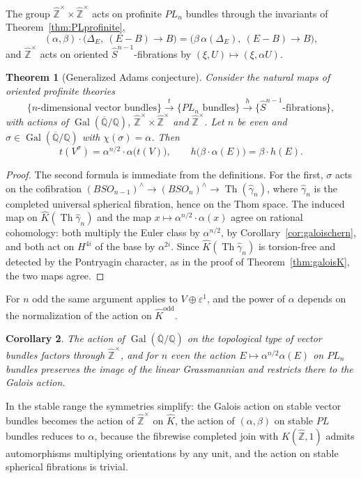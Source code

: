 \documentclass[11pt]{amsart}
\theoremstyle{plain}
\newtheorem{theorem}{Theorem}[section]
\newtheorem{corollary}[theorem]{Corollary}
\theoremstyle{definition}
\numberwithin{equation}{section}
\newcommand{\Q}{\mathbb{Q}}
\newcommand{\Zhat}{\widehat{\mathbb{Z}}}
\newcommand{\Qbar}{\overline{\mathbb{Q}}}
\newcommand{\units}{^{\times}}
\DeclareMathOperator{\Gal}{Gal}
\begin{document}
The group $\Zhat\units\times\Zhat\units$ acts on profinite $PL_n$ bundles through the invariants of Theorem~\ref{thm:PLprofinite},
\[
(\alpha,\beta)\cdot\bigl(\Delta_E,\ (E-B)\to B\bigr)=\bigl(\beta\,\alpha(\Delta_E),\ (E-B)\to B\bigr),
\]
and $\Zhat\units$ acts on oriented $\widehat S^{n-1}$-fibrations by $(\xi,U)\mapsto(\xi,\alpha U)$.

\begin{theorem}[Generalized Adams conjecture]\label{thm:genadams}
Consider the natural maps of oriented profinite theories
\[
\{n\text{-dimensional vector bundles}\}\xrightarrow{t}\{PL_n\text{ bundles}\}\xrightarrow{h}\{\widehat S^{n-1}\text{-fibrations}\},
\]
with actions of $\Gal(\Qbar/\Q)$, $\Zhat\units\times\Zhat\units$ and $\Zhat\units$.
Let $n$ be even and $\sigma\in\Gal(\Qbar/\Q)$ with $\chi(\sigma)=\alpha$.
Then
\[
t(V^\sigma)=\alpha^{n/2}\cdot\alpha\bigl(t(V)\bigr),\qquad h\bigl(\beta\cdot\alpha(E)\bigr)=\beta\cdot h(E).
\]
\end{theorem}

\begin{proof}
The second formula is immediate from the definitions.
For the first, $\sigma$ acts on the cofibration $(BSO_{n-1})^\wedge\to(BSO_n)^\wedge\to\operatorname{Th}(\widehat\gamma_n)$, where $\widehat\gamma_n$ is the completed universal spherical fibration, hence on the Thom space.
The induced map on $\widehat K(\operatorname{Th}\widehat\gamma_n)$ and the map $x\mapsto\alpha^{n/2}\cdot\alpha(x)$ agree on rational cohomology: both multiply the Euler class by $\alpha^{n/2}$, by Corollary~\ref{cor:galoischern}, and both act on $H^{4i}$ of the base by $\alpha^{2i}$.
Since $\widehat K(\operatorname{Th}\widehat\gamma_n)$ is torsion-free and detected by the Pontryagin character, as in the proof of Theorem~\ref{thm:galoisK}, the two maps agree.
\end{proof}

For $n$ odd the same argument applies to $V\oplus\varepsilon^1$, and the power of $\alpha$ depends on the normalization of the action on $\widehat K^{\mathrm{odd}}$.

\begin{corollary}
The action of $\Gal(\Qbar/\Q)$ on the topological type of vector bundles factors through $\Zhat\units$, and for $n$ even the action $E\mapsto\alpha^{n/2}\alpha(E)$ on $PL_n$ bundles preserves the image of the linear Grassmannian and restricts there to the Galois action.
\end{corollary}

In the stable range the symmetries simplify: the Galois action on stable vector bundles becomes the action of $\Zhat\units$ on $\widehat K$, the action of $(\alpha,\beta)$ on stable $PL$ bundles reduces to $\alpha$, because the fibrewise completed join with $K(\Zhat,1)$ admits automorphisms multiplying orientations by any unit, and the action on stable spherical fibrations is trivial.
\end{document}
